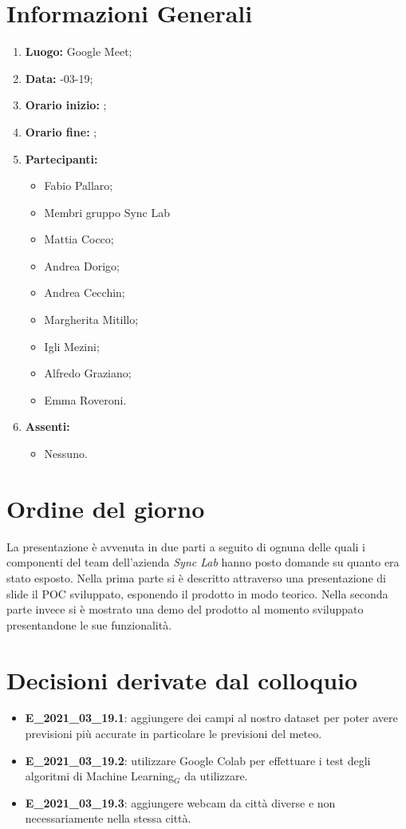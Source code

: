 \newpage
\section{Informazioni Generali}
\begin{enumerate}
	\item \textbf{Luogo:} \normalfont Google Meet;
	\item \textbf{Data:} -03-19;
	\item \textbf{Orario inizio:} ;
	\item \textbf{Orario fine:} ;
	\item \textbf{Partecipanti:}
	\begin{itemize}
		\item Fabio Pallaro;
		\item Membri gruppo Sync Lab
		\item Mattia Cocco;
		\item Andrea Dorigo;
		\item Andrea Cecchin;
		\item Margherita Mitillo;
		\item Igli Mezini;
		\item Alfredo Graziano;
		\item Emma Roveroni.
	\end{itemize}
	\item \textbf{Assenti:}
	\begin{itemize}
		\item Nessuno.
	\end{itemize}
\end{enumerate}
\section{Ordine del giorno}
La presentazione è avvenuta in due parti a seguito di ognuna delle quali i componenti del team dell'azienda \textit{Sync Lab} hanno posto domande su quanto era stato esposto. Nella prima parte si è descritto attraverso una presentazione di slide il POC sviluppato, esponendo il prodotto in modo teorico. Nella seconda parte invece si è mostrato una demo del prodotto al momento sviluppato presentandone le sue funzionalità. 
\section{Decisioni derivate dal colloquio}
\begin{itemize}
	\item \textbf{E\_2021\_03\_19.1}: aggiungere dei campi al nostro dataset per poter avere previsioni più accurate in particolare le previsioni del meteo.
\end{itemize}
\begin{itemize}
	\item \textbf{E\_2021\_03\_19.2}: utilizzare Google Colab per effettuare i test degli algoritmi di Machine Learning$_G$ da utilizzare.
\end{itemize}
\begin{itemize}
	\item \textbf{E\_2021\_03\_19.3}: aggiungere webcam da città diverse e non necessariamente nella stessa città.
\end{itemize}